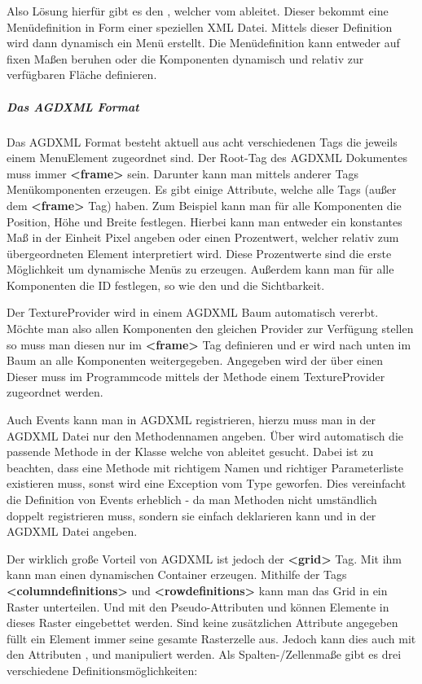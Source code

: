 Also Lösung hierfür gibt es den , welcher vom  ableitet. Dieser bekommt eine Menüdefinition in Form einer speziellen XML Datei. Mittels dieser Definition wird dann dynamisch ein Menü erstellt. Die Menüdefinition kann entweder auf fixen Maßen beruhen oder die Komponenten dynamisch und relativ zur verfügbaren Fläche definieren.

\subparagraph{Das AGDXML Format}


Das AGDXML Format besteht aktuell aus acht verschiedenen Tags die jeweils einem MenuElement zugeordnet sind. Der Root-Tag des AGDXML Dokumentes muss immer \textbf{<frame>} sein. Darunter kann man mittels anderer Tags Menükomponenten erzeugen. Es gibt einige Attribute, welche alle Tags (außer dem \textbf{<frame>} Tag) haben. Zum Beispiel kann man für alle Komponenten die Position, Höhe und Breite festlegen. Hierbei kann man entweder ein konstantes Maß in der Einheit Pixel angeben oder einen Prozentwert, welcher relativ zum übergeordneten Element interpretiert wird. Diese Prozentwerte sind die erste Möglichkeit um dynamische Menüs zu erzeugen. Außerdem kann man für alle Komponenten die ID festlegen, so wie den  und die Sichtbarkeit.

Der TextureProvider wird in einem AGDXML Baum automatisch vererbt. Möchte man also allen Komponenten den gleichen Provider zur Verfügung stellen so muss man diesen nur im \textbf{<frame>} Tag definieren und er wird nach unten im Baum an alle Komponenten weitergegeben. 
Angegeben wird der  über einen  Dieser muss im Programmcode mittels der Methode  einem TextureProvider zugeordnet werden.

Auch Events kann man in AGDXML registrieren, hierzu muss man in der AGDXML Datei nur den Methodennamen angeben. Über  wird automatisch die passende Methode in der Klasse welche von  ableitet gesucht. Dabei ist zu beachten, dass eine Methode mit richtigem Namen und richtiger Parameterliste existieren muss, sonst wird eine Exception vom Type  geworfen. Dies vereinfacht die Definition von Events erheblich - da man Methoden nicht umständlich doppelt registrieren muss, sondern sie einfach deklarieren kann und in der AGDXML Datei angeben.

Der wirklich große Vorteil von AGDXML ist jedoch der \textbf{<grid>} Tag. Mit ihm kann man einen dynamischen Container erzeugen. Mithilfe der Tags \textbf{<columndefinitions>} und \textbf{<rowdefinitions>} kann man das Grid in ein Raster unterteilen. Und mit den Pseudo-Attributen  und  können Elemente in dieses Raster eingebettet werden. Sind keine zusätzlichen Attribute angegeben füllt ein Element immer seine gesamte Rasterzelle aus. Jedoch kann dies auch mit den Attributen ,  und  manipuliert werden. Als Spalten-/Zellenmaße gibt es drei verschiedene Definitionsmöglichkeiten:

